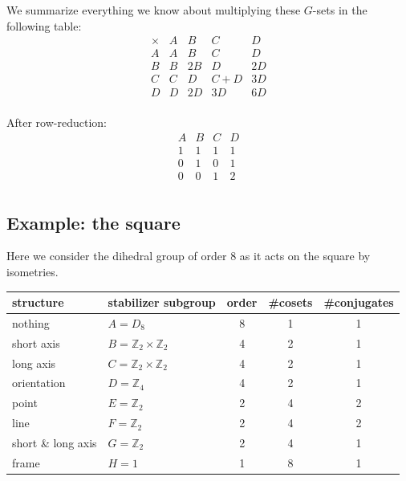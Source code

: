 \documentclass[11pt,oneside]{article}
\newcommand{\Integer}{\mathbb{Z}}
\newcommand{\thinplus}{\!+\!}
\begin{document}
We summarize everything we know about 
multiplying these $G$-sets in the following table:
{\small
$$
\begin{array}{r|rrrr}
\times & A & B & C & D \\
\hline
A & A & B & C & D \\
B & B & 2B & D & 2D \\
C & C & D & C\thinplus D & 3D \\
D & D & 2D & 3D & 6D \\
\end{array}
$$
}

After row-reduction:
$$
\begin{array}{rrrr}
 A & B & C & D \\
\hline
1 & 1 & 1 & 1 \\
0 & 1 & 0 & 1 \\
0 & 0 & 1 & 2 \\
\end{array}
$$

\subsection{Example: the square}

Here we consider the dihedral group of order 8 as
it acts on the square by isometries.

\begin{samepage}
\begin{center}
\begin{tabular}{ |l|l|c|c|c| }
\hline
structure & stabilizer subgroup & order & \#cosets & \#conjugates \\
\hline
\hline
nothing & $A=D_8$ &       8        &  1      &   1         \\
\hline
short axis& $B=\Integer_2\times\Integer_2$ &       4        &  2      &   1         \\
\hline
long axis & $C=\Integer_2\times\Integer_2$ &       4        &  2      &   1         \\
\hline
orientation & $D=\Integer_4$ &       4        &  2      &   1         \\
\hline
point & $E=\Integer_2$ &       2        &  4      &   2         \\
\hline
line  & $F=\Integer_2$ &       2        &  4      &   2         \\
\hline
short \& long axis & $G=\Integer_2$ &       2        &  4      &   1         \\
\hline
frame & $H=1 $ &       1        &  8      &   1         \\
\hline
\end{tabular}
\end{center}
\end{samepage}
\end{document}
